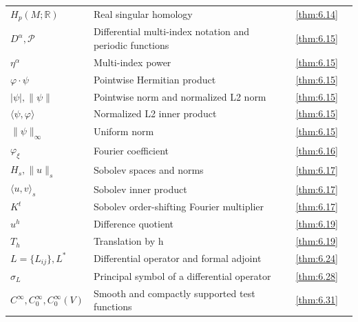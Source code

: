 {\begin{longtable}{@{}>{\raggedright\arraybackslash}p{.39\linewidth}>{\raggedright\arraybackslash}p{.39\linewidth}r r@{}}
$H_p(M;\mathbb R)$ & Real singular homology & \ref{thm:6.14} & \pageref{thm:6.14} \\
$D^\alpha,\allowbreak \mathcal P$ & Differential multi-index notation and periodic functions & \ref{thm:6.15} & \pageref{thm:6.15} \\
$\eta^\alpha$ & Multi-index power & \ref{thm:6.15} & \pageref{thm:6.15} \\
$\varphi\cdot\psi$ & Pointwise Hermitian product & \ref{thm:6.15} & \pageref{thm:6.15} \\
$|\psi|,\allowbreak \|\psi\|$ & Pointwise norm and normalized L2 norm & \ref{thm:6.15} & \pageref{thm:6.15} \\
$\langle\psi,\allowbreak \varphi\rangle$ & Normalized L2 inner product & \ref{thm:6.15} & \pageref{thm:6.15} \\
$\|\psi\|_\infty$ & Uniform norm & \ref{thm:6.15} & \pageref{thm:6.15} \\
$\varphi_\xi$ & Fourier coefficient & \ref{thm:6.16} & \pageref{thm:6.16} \\
$H_s,\allowbreak \|u\|_s$ & Sobolev spaces and norms & \ref{thm:6.17} & \pageref{thm:6.17} \\
$\langle u,\allowbreak v\rangle_s$ & Sobolev inner product & \ref{thm:6.17} & \pageref{thm:6.17} \\
$K^t$ & Sobolev order-shifting Fourier multiplier & \ref{thm:6.17} & \pageref{thm:6.17} \\
$u^h$ & Difference quotient & \ref{thm:6.19} & \pageref{thm:6.19} \\
$T_h$ & Translation by h & \ref{thm:6.19} & \pageref{thm:6.19} \\
$L=\{L_{ij}\},\allowbreak L^*$ & Differential operator and formal adjoint & \ref{thm:6.24} & \pageref{thm:6.24} \\
$\sigma_L$ & Principal symbol of a differential operator & \ref{thm:6.28} & \pageref{thm:6.28} \\
$C^\infty,\allowbreak C_0^\infty,\allowbreak C_0^\infty(V)$ & Smooth and compactly supported test functions & \ref{thm:6.31} & \pageref{thm:6.31} \\
\end{longtable}}
